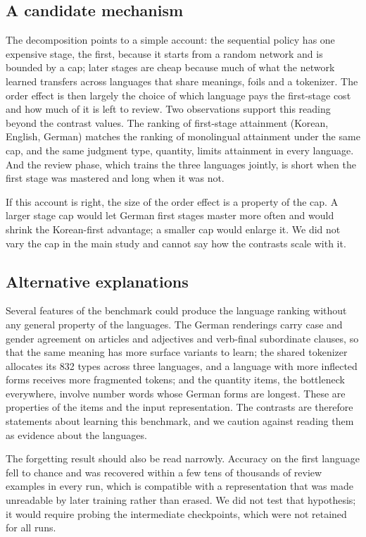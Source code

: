 \documentclass[preprint,12pt,authoryear]{elsarticle}
\begin{document}
\subsection{A candidate mechanism}

The decomposition points to a simple account: the sequential policy has one expensive stage, the first, because it starts from a random network and is bounded by a cap; later stages are cheap because much of what the network learned transfers across languages that share meanings, foils and a tokenizer. The order effect is then largely the choice of which language pays the first-stage cost and how much of it is left to review. Two observations support this reading beyond the contrast values. The ranking of first-stage attainment (Korean, English, German) matches the ranking of monolingual attainment under the same cap, and the same judgment type, quantity, limits attainment in every language. And the review phase, which trains the three languages jointly, is short when the first stage was mastered and long when it was not.

If this account is right, the size of the order effect is a property of the cap. A larger stage cap would let German first stages master more often and would shrink the Korean-first advantage; a smaller cap would enlarge it. We did not vary the cap in the main study and cannot say how the contrasts scale with it.

\subsection{Alternative explanations}

Several features of the benchmark could produce the language ranking without any general property of the languages. The German renderings carry case and gender agreement on articles and adjectives and verb-final subordinate clauses, so that the same meaning has more surface variants to learn; the shared tokenizer allocates its 832 types across three languages, and a language with more inflected forms receives more fragmented tokens; and the quantity items, the bottleneck everywhere, involve number words whose German forms are longest. These are properties of the items and the input representation. The contrasts are therefore statements about learning this benchmark, and we caution against reading them as evidence about the languages.

The forgetting result should also be read narrowly. Accuracy on the first language fell to chance and was recovered within a few tens of thousands of review examples in every run, which is compatible with a representation that was made unreadable by later training rather than erased. We did not test that hypothesis; it would require probing the intermediate checkpoints, which were not retained for all runs.
\end{document}
